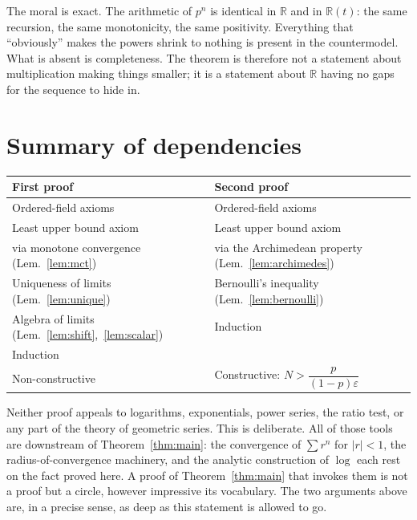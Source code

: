 \documentclass{essay}
\begin{document}
The moral is exact. The arithmetic of $p^{n}$ is identical in $\mathbb{R}$ and in
$\mathbb{R}(t)$: the same recursion, the same monotonicity, the same positivity.
Everything that ``obviously'' makes the powers shrink to nothing is present in the
countermodel. What is absent is completeness. The theorem is therefore not a
statement about multiplication making things smaller; it is a statement about
$\mathbb{R}$ having no gaps for the sequence to hide in.

\section{Summary of dependencies}

\begin{center}
\begin{tabular}{ll}
\hline
\textbf{First proof} & \textbf{Second proof} \\
\hline
Ordered-field axioms & Ordered-field axioms \\
Least upper bound axiom & Least upper bound axiom \\
\quad via monotone convergence (Lem.~\ref{lem:mct})
  & \quad via the Archimedean property (Lem.~\ref{lem:archimedes}) \\
Uniqueness of limits (Lem.~\ref{lem:unique}) & Bernoulli's inequality
  (Lem.~\ref{lem:bernoulli}) \\
Algebra of limits (Lem.~\ref{lem:shift},~\ref{lem:scalar}) & Induction \\
Induction & \\
\hline
Non-constructive & Constructive: $N > \dfrac{p}{(1-p)\varepsilon}$ \\
\hline
\end{tabular}
\end{center}

\medskip

\noindent
Neither proof appeals to logarithms, exponentials, power series, the ratio test, or
any part of the theory of geometric series. This is deliberate. All of those tools
are downstream of Theorem~\ref{thm:main}: the convergence of $\sum r^{n}$ for
$|r| < 1$, the radius-of-convergence machinery, and the analytic construction of
$\log$ each rest on the fact proved here. A proof of Theorem~\ref{thm:main} that
invokes them is not a proof but a circle, however impressive its vocabulary. The two
arguments above are, in a precise sense, as deep as this statement is allowed to go.
\end{document}
